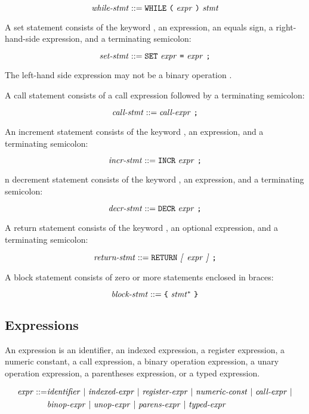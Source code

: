 \documentclass[10pt]{article}
\begin{document}
$$\mbox{\textit{while-stmt}} ::= \mbox{\texttt{WHILE} \texttt{(} \ensuremath{\mbox{\textit{expr}}}
  \texttt{)} \ensuremath{\mbox{\textit{stmt}}}}$$

 A set statement consists of the keyword
, an expression, an equals sign, a right-hand-side
expression, and a terminating semicolon:

$$\mbox{\textit{set-stmt}} ::= \mbox{\texttt{SET} \ensuremath{\mbox{\textit{expr}}} \texttt{=}
  \ensuremath{\mbox{\textit{expr}}} \texttt{;}}$$

\noindent
The left-hand side expression may not be a binary operation \kwd{=}.

 A call statement consists of a call
expression followed by a terminating semicolon:

$$\mbox{\textit{call-stmt}} ::= \mbox{\ensuremath{\mbox{\textit{call-expr}}} \texttt{;}}$$

 An increment statement consists of the
keyword , an expression, and a terminating semicolon:

$$\mbox{\textit{incr-stmt}} ::= \mbox{\texttt{INCR} \ensuremath{\mbox{\textit{expr}}} \texttt{;}}$$

 n decrement statement consists of the
keyword , an expression, and a terminating semicolon:

$$\mbox{\textit{decr-stmt}} ::= \mbox{\texttt{DECR} \ensuremath{\mbox{\textit{expr}}} \texttt{;}}$$

 A return statement consists of the keyword
, an optional expression, and a terminating semicolon:

$$\mbox{\textit{return-stmt}} ::= \mbox{\texttt{RETURN} \textit{[} \ensuremath{\mbox{\textit{expr}}} \textit{]}
    \texttt{;}}$$

 A block statement consists of zero or more
statements enclosed in braces:

$$\mbox{\textit{block-stmt}} ::= \mbox{\texttt{\{} \ensuremath{\mbox{\textit{stmt}}}$^*$
  \texttt{\}}}$$

\subsection{Expressions}
\label{sec:syntax:expressions}

An expression is an identifier, an indexed expression, a register
expression, a numeric constant, a call expression, a binary operation
expression, a unary operation expression, a parentheses expression, or
a typed expression.

\begin{equation*}
\begin{split}
%
\nonterm{expr} ::= & \mbox{\nonterm{identifier} $|$
  \nonterm{indexed-expr} $|$ \nonterm{register-expr} $|$
  \nonterm{numeric-const} $|$ \nonterm{call-expr} $|$} \\
%
  & \mbox{\nonterm{binop-expr} $|$ \nonterm{unop-expr} $|$
  \nonterm{parens-expr} $|$ \nonterm{typed-expr}}
%
\end{split}
\end{equation*}
\end{document}
